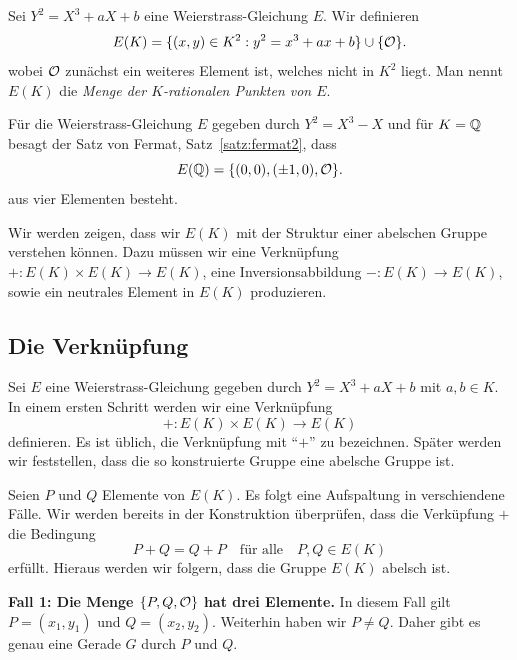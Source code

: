 \begin{definition}
  Sei $Y^2 = X^3+aX+b$ eine Weierstrass-Gleichung $E$.
  Wir definieren 
  \begin{equation*}
    E(K) = \{(x,y) \in K^2 : y^2 = x^3 + ax+b\} \cup \{{\mathcal O}\}.
  \end{equation*}
  wobei ${\mathcal O}$ zunächst ein weiteres Element ist, welches nicht in
  $K^2$ liegt. Man nennt $E(K)$ die \emph{Menge der $K$-rationalen Punkten
  von $E$}. 
\end{definition}

\begin{beispiel}
  \label{bsp:fermat}
  Für die Weierstrass-Gleichung $E$ gegeben durch $Y^2 = X^3-X$ und
  für $K={\mathbb{Q}}$ besagt der 
  Satz von Fermat, Satz~\ref{satz:fermat2}, dass
  $$ E({\mathbb{Q}}) = \{(0,0), (\pm 1,0), {\mathcal O}\} .$$
  aus vier Elementen besteht. 
\end{beispiel}

Wir werden zeigen, dass wir $E(K)$ mit der Struktur einer abelschen
Gruppe verstehen können.
Dazu müssen wir eine Verknüpfung $+\colon E(K)\times
E(K)\rightarrow E(K)$, eine Inversionsabbildung
$-\colon E(K)\rightarrow E(K)$, sowie ein neutrales Element in $E(K)$
produzieren.



\subsection{Die Verknüpfung}
\label{sec:verknuepfung}

Sei $E$ eine Weierstrass-Gleichung gegeben durch $Y^2 = X^3+aX+b$ mit
$a,b\in K$. 
In einem ersten Schritt werden wir eine Verknüpfung
\begin{equation*}
  + \colon E(K)\times E(K) \rightarrow E(K)
\end{equation*}
definieren. Es ist üblich, die Verknüpfung mit ``$+$'' zu bezeichnen.
Später werden wir feststellen, dass die so konstruierte Gruppe eine
abelsche Gruppe ist. 

Seien $P$ und $Q$ Elemente von $E(K)$. Es folgt eine Aufspaltung in
verschiendene Fälle. Wir werden bereits in der Konstruktion
überprüfen, dass die Verküpfung $+$ die Bedingung
$$
P+Q=Q+P\quad\text{für alle}\quad P,Q\in E(K) 
$$
erfüllt. Hieraus werden wir folgern, dass die Gruppe $E(K)$ abelsch
ist.  

\medskip
\textbf{Fall 1: Die Menge $\{P,Q,{\mathcal O}\}$ hat drei Elemente.} In diesem
Fall gilt $P = (x_1,y_1)$ und $Q = (x_2,y_2)$. Weiterhin haben wir
$P\not=Q$.
Daher gibt es genau eine Gerade $G$ durch $P$ und $Q$.


